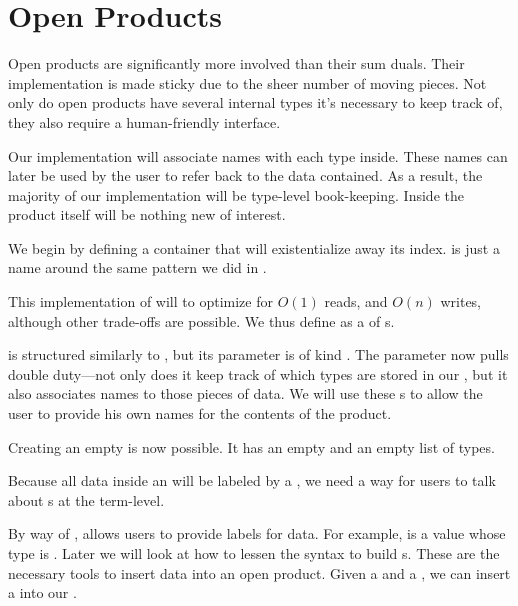 \documentclass[book.tex]{subfiles}
\begin{document}
\section{Open Products}


Open products are significantly more involved than their sum duals. Their
implementation is made sticky due to the sheer number of moving pieces. Not only
do open products have several internal types it's necessary to keep track of,
they also require a human-friendly interface.

Our implementation will associate names with each type inside. These names can
later be used by the user to refer back to the data contained. As a result, the
majority of our implementation will be type-level book-keeping. Inside the
product itself will be nothing new of interest.

We begin by defining a container  that will existentialize away its
 index.  is just a name around the same pattern we did in
.


This implementation of  will to optimize for $O(1)$ reads, and
$O(n)$ writes, although other trade-offs are possible. We thus define
 as a  of s.


 is structured similarly to , but its 
parameter is of kind \kind{[(Symbol, k)]}. The parameter  now pulls
double duty---not only does it keep track of which types are stored in our
, but it also associates names to those pieces of data. We will
use these s to allow the user to provide his own names for the
contents of the product.

Creating an empty  is now possible. It has an empty 
and an empty list of types.


Because all data inside an  will be labeled by a ,
we need a way for users to talk about s at the term-level.


By way of ,  allows users to provide labels
for data. For example,  is a value whose type is . Later  we will look at how to
lessen the syntax to build s. These are the necessary tools to insert
data into an open product. Given a  and a , we can insert a
 into our .
\end{document}
